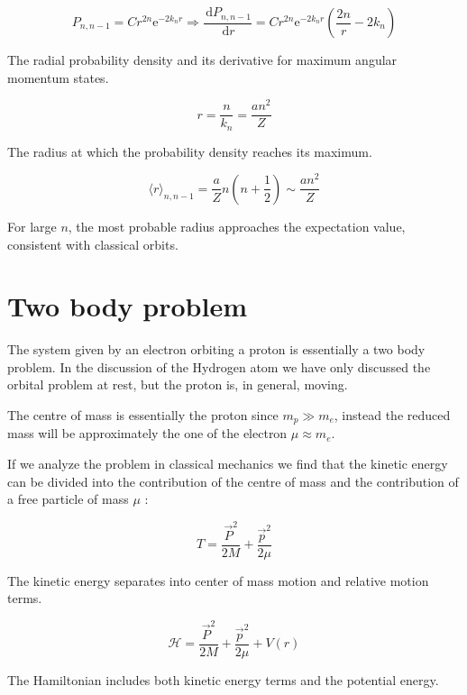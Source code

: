 \begin{equation}
P_{n, n-1}=C r^{2 n} \mathrm{e}^{-2 k_{n} r} \Longrightarrow \frac{\, \mathrm{d} P_{n, n-1}}{\, \mathrm{d} r}=C r^{2 n} \mathrm{e}^{-2 k_{n} r}\left(\frac{2 n}{r}-2 k_{n}\right)
\end{equation}

The radial probability density and its derivative for maximum angular momentum states.

\begin{equation}
r=\frac{n}{k_{n}}=\frac{a n^{2}}{Z}
\end{equation}

The radius at which the probability density reaches its maximum.

\begin{equation}
\langle r\rangle_{n, n-1}=\frac{a}{Z} n\left(n+\frac{1}{2}\right) \sim \frac{a n^{2}}{Z}
\end{equation}

For large $n$, the most probable radius approaches the expectation value, consistent with classical orbits.

\section{Two body problem}
The system given by an electron orbiting a proton is essentially a two body problem. In the discussion of the Hydrogen atom we have only discussed the orbital problem at rest, but the proton is, in general, moving.

The centre of mass is essentially the proton since $m_{p} \gg m_{e}$, instead the reduced mass will be approximately the one of the electron $\mu \approx m_{e}$.

If we analyze the problem in classical mechanics we find that the kinetic energy can be divided into the contribution of the centre of mass and the contribution of a free particle of mass $\mu$ :

\begin{equation}
T=\frac{\vec{P}^{2}}{2 M}+\frac{\vec{p}^{2}}{2 \mu}
\end{equation}

The kinetic energy separates into center of mass motion and relative motion terms.

\begin{equation}
\mathcal{H}=\frac{\vec{P}^{2}}{2 M}+\frac{\vec{p}^{2}}{2 \mu}+V(r)
\end{equation}

The Hamiltonian includes both kinetic energy terms and the potential energy.

